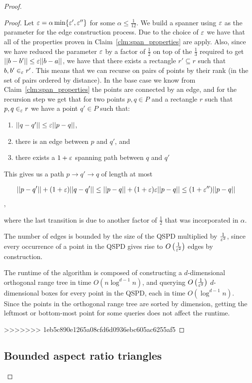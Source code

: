 \documentclass[12pt]{article}%
\begin{document}
\begin{proof}
\begin{proof} 
	Let $\varepsilon = \alpha \min \{\varepsilon',\varepsilon''\}$ for some $\alpha \leq \frac{1}{12}$. We build a spanner using $\varepsilon$ as the parameter for the edge construction process. Due to the choice of $\varepsilon$ we have that all of the properties proven in Claim~\ref{clm:span_properties} are apply. Also, since we have reduced the parameter $\varepsilon$ by a factor of $\frac{1}{2}$ on top of the $\frac{1}{3}$ required to get $||b-b'||\leq \varepsilon ||b-a||$, we have that there exists a rectangle $r'\subseteq r$ such that $b,b'\in_{\varepsilon}r'$. This means that we can recurse on pairs of points by their rank (in the set of pairs ordered by distance). In the base case we know from Claim~\ref{clm:span_properties} the points are connected by an edge, and for the recursion step we get that for two points $p,q\in P$ and a rectangle $r$ such that $p,q\in_{\varepsilon} r$ we have a point $q'\in P$ such that:
	\begin{enumerate}
		\item $||q-q'||\leq \varepsilon||p-q||$,
		\item there is an edge between $p$ and $q'$, and
		\item there exists a $1+\varepsilon$ spanning path between $q$ and $q'$
	\end{enumerate}

	This gives us a path $p\rightarrow q' \rightarrow q$ of length at most
	
	$$||p-q'||+(1+\varepsilon)||q-q'||\leq ||p-q||+(1+\varepsilon)\varepsilon||p-q||\leq (1+\varepsilon'')||p-q||$$,
	
	where the last transition is due to another factor of $\frac{1}{2}$ that was incorporated in $\alpha$. 
	
	The number of edges is bounded by the size of the QSPD multiplied by $\frac{1}{\varepsilon^2}$, since every occurrence of a point in the QSPD gives rise to $O\left(\frac{1}{\varepsilon^2}\right)$ edges by construction.
	
	The runtime of the algorithm is composed of constructing a $d$-dimensional orthogonal range tree in time $O(n\log^{d-1}n)$, and querying $O\left(\frac{1}{\varepsilon^2}\right)$ $d$-dimensional boxes for every point in the QSPD, each in time $O(\log^{d-1}n)$. Since the points in the orthogonal range tree are sorted by dimension, getting the leftmost or bottom-most point for some queries does not affect the runtime.
	
>>>>>>> 1eb5c890e1265a08cfd6d0936ebc605ac6255af5
\end{proof}


\subsection{Bounded aspect ratio triangles}


\end{proof}
\end{document}
